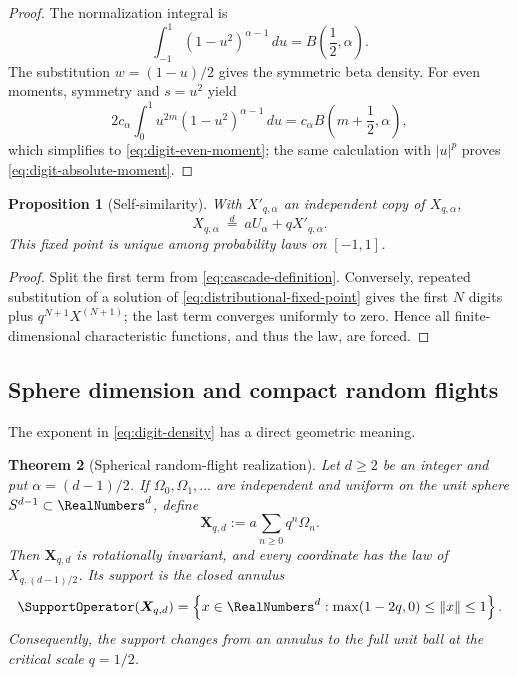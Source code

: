\documentclass[11pt]{article}
\newtheorem{theorem}{Theorem}[section]
\newtheorem{proposition}[theorem]{Proposition}
\theoremstyle{definition}
\theoremstyle{remark}
\begin{document}
\begin{proof}
The normalization integral is
\[
 \int_{-1}^{1}(1-u^2)^{\alpha-1}\,du
 =B\left(\frac12,\alpha\right).
\]
The substitution \(w=(1-u)/2\) gives the symmetric beta density.  For even
moments, symmetry and \(s=u^2\) yield
\[
 2c_\alpha\int_0^1u^{2m}(1-u^2)^{\alpha-1}\,du
 =c_\alpha B\left(m+\frac12,\alpha\right),
\]
which simplifies to \eqref{eq:digit-even-moment}; the same calculation with
\(|u|^p\) proves \eqref{eq:digit-absolute-moment}.
\end{proof}

\begin{proposition}[Self-similarity]
\label{prop:self-similarity}
With \(X'_{q,\alpha}\) an independent copy of \(X_{q,\alpha}\),
\begin{equation}
 X_{q,\alpha}\ \overset d=\ aU_\alpha+qX'_{q,\alpha}.
 \label{eq:distributional-fixed-point}
\end{equation}
This fixed point is unique among probability laws on \([-1,1]\).
\end{proposition}

\begin{proof}
Split the first term from \eqref{eq:cascade-definition}.  Conversely, repeated
substitution of a solution of \eqref{eq:distributional-fixed-point} gives the
first \(N\) digits plus \(q^{N+1}X^{(N+1)}\); the last term converges uniformly
to zero.  Hence all finite-dimensional characteristic functions, and thus the
law, are forced.
\end{proof}

\subsection{Sphere dimension and compact random flights}

The exponent in \eqref{eq:digit-density} has a direct geometric meaning.

\begin{theorem}[Spherical random-flight realization]
\label{thm:spherical-realization}
Let \(d\ge2\) be an integer and put \(\alpha=(d-1)/2\).  If
\(\Omega_0,\Omega_1,\ldots\) are independent and uniform on the unit sphere
\(S^{d-1}\subset\RealNumbers^d\), define
\begin{equation}
 \bm X_{q,d}:=a\sum_{n\ge0}q^n\Omega_n.
 \label{eq:vector-cascade}
\end{equation}
Then \(\bm X_{q,d}\) is rotationally invariant, and every coordinate has the
law of \(X_{q,(d-1)/2}\).  Its support is the closed annulus
\begin{equation}
 \SupportOperator(\bm X_{q,d})
 =\left\{x\in\RealNumbers^d:
 \max(1-2q,0)\le\|x\|\le1\right\}.
 \label{eq:vector-support}
\end{equation}
Consequently, the support changes from an annulus to the full unit ball at the
critical scale \(q=1/2\).
\end{theorem}
\end{document}
